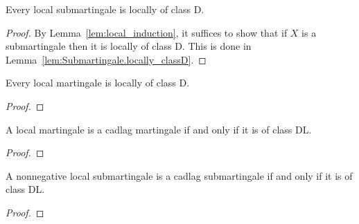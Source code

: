 \begin{lemma}\label{lem:IsLocalSubmartingale.locally_classD}
  \leanok
Every local submartingale is locally of class D.
\end{lemma}

\begin{proof}
  \leanok
By Lemma~\ref{lem:local_induction}, it suffices to show that if $X$ is a submartingale then it is locally of class D.
This is done in Lemma~\ref{lem:Submartingale.locally_classD}.
\end{proof}


\begin{lemma}\label{lem:IsLocalMartingale.locally_classD}
  \notready
Every local martingale is locally of class D.
\end{lemma}

\begin{proof}

\end{proof}


\begin{lemma}\label{lem:IsLocalMartingale.martingale_iff_classDL}
  \notready
A local martingale is a cadlag martingale if and only if it is of class DL.
\end{lemma}

\begin{proof}

\end{proof}


\begin{lemma}\label{lem:IsLocalSubmartingale.submartingale_iff_classDL_of_nonnegative}
  \notready
A nonnegative local submartingale is a cadlag submartingale if and only if it is of class DL.
\end{lemma}

\begin{proof}

\end{proof}
